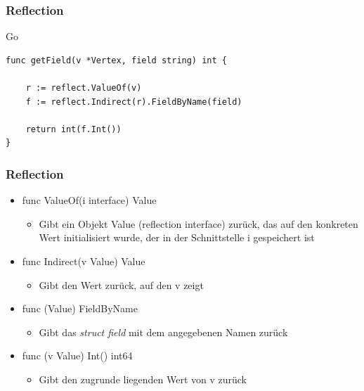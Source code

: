 \documentclass{beamer}
\begin{document}
\begin{frame}[fragile]
\frametitle{Reflection}

Go
\begin{lstlisting}
func getField(v *Vertex, field string) int {

    r := reflect.ValueOf(v)
    f := reflect.Indirect(r).FieldByName(field)

    return int(f.Int())
}
\end{lstlisting}

\end{frame}

\begin{frame}
\frametitle{Reflection}

\begin{itemize}
\setlength{\itemsep}{24pt}
\item func ValueOf(i interface{}) Value
\begin{itemize}
\item Gibt ein Objekt Value (reflection interface) zurück, das auf den konkreten Wert initialisiert wurde, der in der Schnittstelle i gespeichert ist
\end{itemize}
\item func Indirect(v Value) Value
\begin{itemize}
\item Gibt den Wert zurück, auf den v zeigt
\end{itemize}
\item func (Value) FieldByName
\begin{itemize}
\item Gibt das \textit{struct field} mit dem angegebenen Namen zur\"uck
\end{itemize}
\item func (v Value) Int() int64
\begin{itemize}
\item Gibt den zugrunde liegenden Wert von v zur\"uck
\end{itemize}
\end{itemize}

\end{frame}
\end{document}
